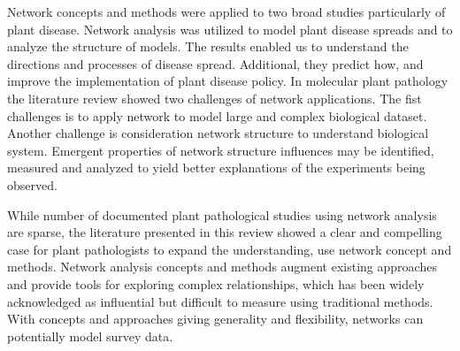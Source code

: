Network concepts and methods were applied to two broad studies particularly of plant disease. Network analysis was utilized to model plant disease spreads and to analyze the structure of models. The results enabled us to understand the directions and processes of disease spread. Additional, they   predict how, and improve the implementation of plant disease policy. In molecular plant pathology the literature review showed two challenges of network applications. The fist challenges is to apply network to model large and complex biological dataset. Another challenge is consideration network structure to understand biological system. Emergent properties of network structure influences may be identified, measured and analyzed to yield better explanations of the experiments being observed.

While number of documented plant pathological studies using network analysis are sparse, the literature presented in this review showed a clear and compelling case for plant pathologists to expand the understanding, use network concept and methods. Network analysis concepts and methods augment existing approaches and provide tools for exploring complex relationships, which has been widely acknowledged as influential but difficult to measure using traditional methods. With concepts and approaches giving generality and flexibility, networks can potentially model survey data. 

